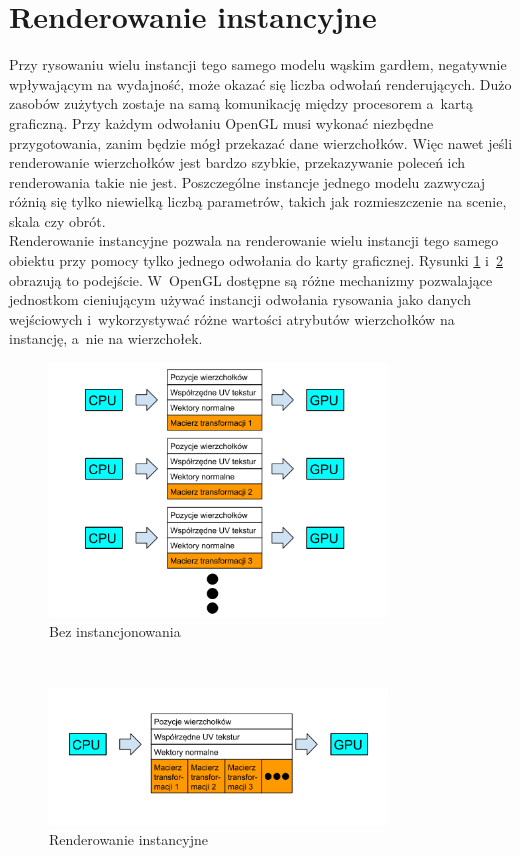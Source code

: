 \documentclass[a4paper,twoside,12pt]{book}
\begin{document}
\section{Renderowanie instancyjne}
Przy rysowaniu wielu instancji tego samego modelu wąskim gardłem, negatywnie wpływającym na wydajność, może okazać się liczba odwołań renderujących. Dużo zasobów zużytych zostaje na samą komunikację między procesorem a~kartą graficzną. Przy każdym odwołaniu OpenGL musi wykonać niezbędne przygotowania, zanim będzie mógł przekazać dane wierzchołków. Więc nawet jeśli renderowanie wierzchołków jest bardzo szybkie, przekazywanie poleceń ich renderowania takie nie jest. Poszczególne instancje jednego modelu zazwyczaj różnią się tylko niewielką liczbą parametrów, takich jak rozmieszczenie na scenie, skala czy obrót. \cite{bib:opengl_insights} \\
Renderowanie instancyjne pozwala na renderowanie wielu instancji tego samego obiektu przy pomocy tylko jednego odwołania do karty graficznej. Rysunki \ref{fig:instancing_chart1} i~\ref{fig:instancing_chart2} obrazują to podejście. W~OpenGL dostępne są różne mechanizmy pozwalające jednostkom cieniującym używać instancji odwołania rysowania jako danych wejściowych i~wykorzystywać różne wartości atrybutów wierzchołków na instancję, a~nie na wierzchołek. \cite{ogl_guide}

\begin{figure}[H]
    \centering
    \includegraphics[width=0.8\textwidth]{res/instancing_chart1.png}
    \caption{Bez instancjonowania}
    \label{fig:instancing_chart1}
\end{figure}
~ %
\begin{figure}[H]
    \centering
    \includegraphics[width=0.8\textwidth]{res/instancing_chart2.png}
    \caption{Renderowanie instancyjne}
    \label{fig:instancing_chart2}
\end{figure}
\end{document}
